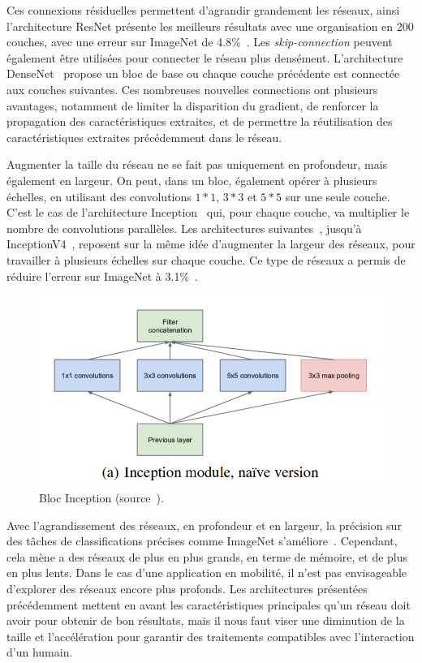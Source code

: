 Ces connexions résiduelles permettent d'agrandir grandement les réseaux, ainsi l'architecture ResNet présente les meilleurs résultats avec une organisation en 200 couches, avec une erreur sur ImageNet de 4.8\%~\cite{he2016identity}.
Les \textit{skip-connection} peuvent également être utilisées pour connecter le réseau plus densément.
L'architecture DenseNet~\cite{huang2017densely} propose un bloc de base ou chaque couche précédente est connectée aux couches suivantes.
Ces nombreuses nouvelles connections ont plusieurs avantages, notamment de limiter la disparition du gradient, de renforcer la propagation des caractéristiques extraites, et de permettre la réutilisation des caractéristiques extraites précédemment dans le réseau.

Augmenter la taille du réseau ne se fait pas uniquement en profondeur, mais également en largeur.
On peut, dans un bloc, également opérer à plusieurs échelles, en utilisant des convolutions $1*1$, $3*3$ et $5*5$ sur une seule couche.
C'est le cas de l'architecture Inception~\cite{szegedy2015going} qui, pour chaque couche, va multiplier le nombre de convolutions parallèles.
Les architectures suivantes~\cite{szegedy2016rethinking}, jusqu'à InceptionV4~\cite{szegedy2017inception}, reposent sur la même idée d'augmenter la largeur des réseaux, pour travailler à plusieurs échelles sur chaque couche.
Ce type de réseaux a permis de réduire l'erreur sur ImageNet à 3.1\%~\cite{szegedy2017inception}.

\begin{figure}%
\includegraphics[width=\columnwidth]{figures/inception1.png}%
\caption{Bloc Inception (source~\cite{szegedy2015going}).}%
\label{fig:inception1}%
\end{figure}

Avec l'agrandissement des réseaux, en profondeur et en largeur, la précision sur des tâches de classifications précises comme ImageNet s'améliore~\cite{szegedy2015going, szegedy2016rethinking, szegedy2017inception}.
Cependant, cela mène a des réseaux de plus en plus grands, en terme de mémoire, et de plus en plus lents.
Dans le cas d'une application en mobilité, il n'est pas envisageable d'explorer des réseaux encore plus profonds.
Les architectures présentées précédemment mettent en avant les caractéristiques principales qu'un réseau doit avoir pour obtenir de bon résultats, mais il nous faut viser une diminution de la taille et l'accélération pour garantir des traitements compatibles avec l'interaction d'un humain.



